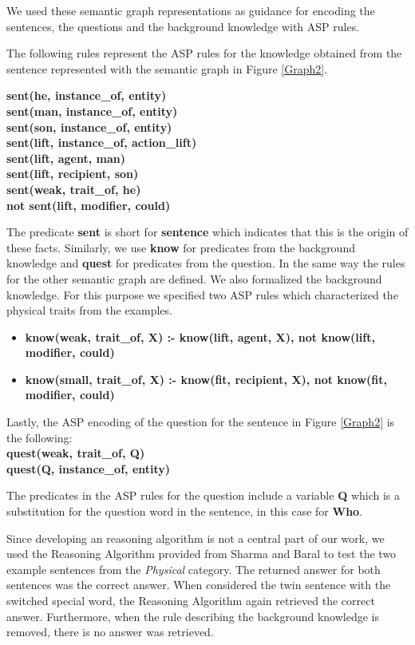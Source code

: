 We used these semantic graph representations as guidance for encoding the sentences, the questions and the background knowledge with ASP rules. 

The following rules represent the ASP rules for the knowledge obtained from the sentence represented with the semantic graph in Figure \ref{Graph2}. 

\textbf{sent(he, instance\_of, entity)} \\
\textbf{sent(man, instance\_of, entity)}\\
\textbf{sent(son, instance\_of, entity)}\\
\textbf{sent(lift, instance\_of, action\_lift)} \\ 
\textbf{sent(lift, agent, man)}\\
\textbf{sent(lift, recipient, son)}\\
\textbf{sent(weak, trait\_of, he)} \\
\textbf{not sent(lift, modifier, could)}

The predicate \textbf{sent} is short for \textbf{sentence} which indicates that this is the origin of these facts. Similarly, we use \textbf{know} for predicates from the background knowledge and \textbf{quest} for predicates from the question. 
In the same way the rules for the other semantic graph are defined. 
We also formalized the background knowledge. For this purpose we specified two ASP rules which characterized the physical traits from the examples.

\begin{itemize}
	\item \textbf{know(weak, trait\_of, X) :- know(lift, agent, X), not know(lift, modifier, could)}
	\item \textbf{know(small, trait\_of, X) :- know(fit, recipient, X), not know(fit, modifier, could)}
\end{itemize}

Lastly, the ASP encoding of the question for the sentence in Figure \ref{Graph2} is the following: \\
\textbf{quest(weak, trait\_of, Q) \\
		quest(Q, instance\_of, entity)}

The predicates in the ASP rules for the question include a variable \textbf{Q} which is a substitution for the question word in the sentence, in this case for \textbf{Who}. 

Since developing an reasoning algorithm is not a central part of our work, we used the Reasoning Algorithm provided from Sharma and Baral \cite{2018CommonsenseKT} to test the two example sentences from the \textit{Physical} category. The returned answer for both sentences was the correct answer. When considered the twin sentence with the switched special word, the Reasoning Algorithm again retrieved the correct answer. Furthermore, when the rule describing the background knowledge is removed, there is no answer was retrieved. 











